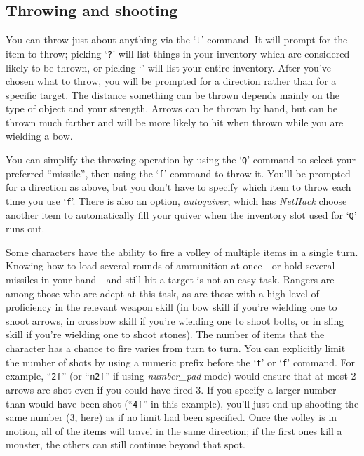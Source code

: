 \subsection*{Throwing and shooting}

You can throw just about anything via the `{\tt t}' command.  It will prompt
for the item to throw; picking `{\tt ?}' will list things in your inventory
which are considered likely to be thrown, or picking `{\tt *}' will list
your entire inventory.  After you've chosen what to throw, you will
be prompted for a direction rather than for a specific target.  The
distance something can be thrown depends mainly on the type of object
and your strength.  Arrows can be thrown by hand, but can be thrown
much farther and will be more likely to hit when thrown while you are
wielding a bow.

You can simplify the throwing operation by using the `{\tt Q}' command to
select your preferred ``missile'', then using the `{\tt f}' command to
throw it.  You'll be prompted for a direction as above, but you don't
have to specify which item to throw each time you use `{\tt f}'.  There is
also an option,
{\it autoquiver},
which has {\it NetHack\/} choose another item to automatically fill your
quiver when the inventory slot used for `{\tt Q}' runs out.

Some characters have the ability to fire a volley of multiple items in a
single turn.  Knowing how to load several rounds of ammunition at
once---or hold several missiles in your hand---and still hit a
target is not an easy task.  Rangers are among those who are adept
at this task, as are those with a high level of proficiency in the
relevant weapon skill (in bow skill if you're wielding one to
shoot arrows, in crossbow skill if you're wielding one to shoot bolts,
or in sling skill if you're wielding one to shoot stones).
The number of items that the character has a chance to fire varies from
turn to turn.  You can explicitly limit the number of shots by using a
numeric prefix before the `{\tt t}' or `{\tt f}' command.
For example, ``{\tt 2f}'' (or ``{\tt n2f}'' if using
{\it number\_pad\/}
mode) would ensure that at most 2 arrows are shot
even if you could have fired 3.  If you specify
a larger number than would have been shot (``{\tt 4f}'' in this example),
you'll just end up shooting the same number (3, here) as if no limit
had been specified.  Once the volley is in motion, all of the items
will travel in the same direction; if the first ones kill a monster,
the others can still continue beyond that spot.

